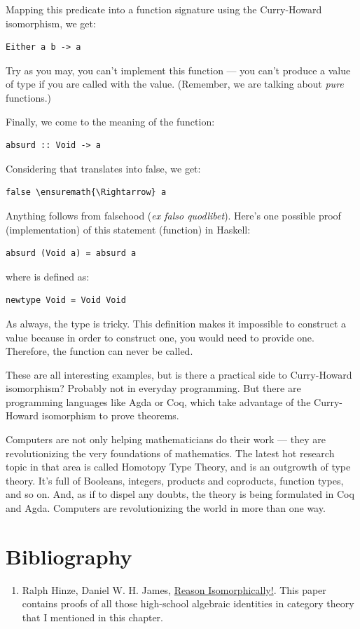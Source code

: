 Mapping this predicate into a function signature using the Curry-Howard
isomorphism, we get:

\begin{verbatim}
Either a b -> a
\end{verbatim}
Try as you may, you can't implement this function --- you can't produce
a value of type  if you are called with the 
value. (Remember, we are talking about \emph{pure} functions.)

Finally, we come to the meaning of the  function:

\begin{verbatim}
absurd :: Void -> a
\end{verbatim}
Considering that  translates into false, we get:

\begin{Verbatim}[commandchars=\\\{\}]
false \ensuremath{\Rightarrow} a
\end{Verbatim}
Anything follows from falsehood (\emph{ex falso quodlibet}). Here's one
possible proof (implementation) of this statement (function) in Haskell:

\begin{verbatim}
absurd (Void a) = absurd a
\end{verbatim}
where  is defined as:

\begin{verbatim}
newtype Void = Void Void
\end{verbatim}
As always, the type  is tricky. This definition makes it
impossible to construct a value because in order to construct one, you
would need to provide one. Therefore, the function  can
never be called.

These are all interesting examples, but is there a practical side to
Curry-Howard isomorphism? Probably not in everyday programming. But
there are programming languages like Agda or Coq, which take advantage
of the Curry-Howard isomorphism to prove theorems.

Computers are not only helping mathematicians do their work --- they are
revolutionizing the very foundations of mathematics. The latest hot
research topic in that area is called Homotopy Type Theory, and is an
outgrowth of type theory. It's full of Booleans, integers, products and
coproducts, function types, and so on. And, as if to dispel any doubts,
the theory is being formulated in Coq and Agda. Computers are
revolutionizing the world in more than one way.

\section{Bibliography}\label{bibliography}

\begin{enumerate}
\tightlist
\item
  Ralph Hinze, Daniel W. H. James,
  \href{http://www.cs.ox.ac.uk/ralf.hinze/publications/WGP10.pdf}{Reason
  Isomorphically!}. This paper contains proofs of all those high-school
  algebraic identities in category theory that I mentioned in this
  chapter.
\end{enumerate}
